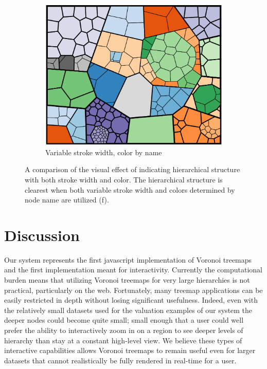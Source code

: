 \documentclass{acm_proc_article-sp} \usepackage{cite}
\begin{document}
\begin{figure}
        \begin{subfigure}[b]{\comparelength}
                \includegraphics[width=\textwidth]{source-images/compare-stroke-name-cropped.PNG}
                \caption{Variable stroke width, color by name}
        \end{subfigure}
\caption{A comparison of the visual effect of indicating hierarchical structure with both stroke width and color.
The hierarchical structure is clearest when both variable stroke width and colors determined by node name are utilized (f).}
\label{fig:comparestrokecolor}
\end{figure}



\section{Discussion}
\label{sec:discussion}
Our system represents the first javascript implementation of Voronoi
treemaps and the first implementation meant for interactivity.
Currently the computational burden means that utilizing Voronoi
treemaps for very large hierarchies is not practical, particularly on
the web. Fortunately, many treemap applications can be easily
restricted in depth without losing significant usefulness. Indeed,
even with the relatively small datasets used for the valuation
examples of our system the deeper nodes could become quite small;
small enough that a user could well prefer the ability to
interactively zoom in on a region to see deeper levels of hierarchy
than stay at a constant high-level view. We believe these types of
interactive capabilities allows Voronoi treemaps to remain useful even
for larger datasets that cannot realistically be fully rendered in real-time
for a user. 
\end{document}
